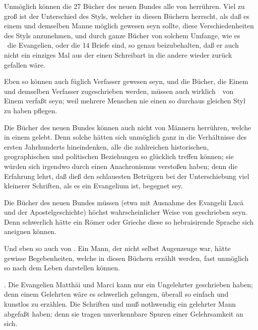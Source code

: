 \begin{aufza}
\item Unmöglich können die 27 Bücher des neuen Bundes alle von  herrühren. Viel zu groß ist der Unterschied des Styls, welcher in diesen Büchern herrscht, als daß es einem und demselben Manne möglich gewesen seyn sollte, diese Verschiedenheiten des Styls anzunehmen, und durch ganze Bücher von solchem Umfange, wie es \zB\ die Evangelien, oder die 14 Briefe  sind, so genau beizubehalten, daß er auch nicht ein einziges Mal aus der einen Schreibart in die andere wieder zurück gefallen wäre.
\item Eben so können auch füglich  Verfasser gewesen seyn, und die Bücher, die Einem und demselben Verfasser zugeschrieben werden, müssen auch wirklich~\ von Einem verfaßt seyn; weil mehrere Menschen nie einen so durchaus gleichen Styl zu haben pflegen.
\item Die Bücher des neuen Bundes können auch nicht von Männern herrühren, welche in einem  gelebt. Denn solche hätten sich unmöglich ganz in die Verhältnisse des ersten Jahrhunderts hineindenken, alle die zahlreichen historischen, geographischen und politischen Beziehungen so glücklich treffen können; sie würden sich irgendwo durch einen Anachronismus verstoßen haben; denn die Erfahrung lehrt, daß dieß den schlauesten Betrügern bei der Unterschiebung viel kleinerer Schriften, als es ein Evangelium ist, begegnet sey.
\item Die Bücher des neuen Bundes müssen (etwa mit Ausnahme des Evangelii Lucä und der Apostelgeschichte) höchst wahrscheinlicher Weise von  geschrieben seyn. Denn schwerlich hätte ein Römer oder Grieche diese so hebraisirende Sprache sich aneignen können.
\item Und eben so auch von . Ein Mann, der nicht selbst Augenzeuge war, hätte gewisse Begebenheiten, welche in diesen Büchern erzählt werden, fast unmöglich so nach dem Leben darstellen können.
\item {}. Die Evangelien Matthäi und Marci kann nur ein Ungelehrter geschrieben haben; denn einem Gelehrten wäre es schwerlich gelungen, überall so einfach und kunstlos zu erzählen. Die Schriften  und  muß nothwendig ein gelehrter Mann abgefaßt haben; denn sie tragen unverkennbare Spuren einer Gelehrsamkeit an sich.
\end{aufza}
